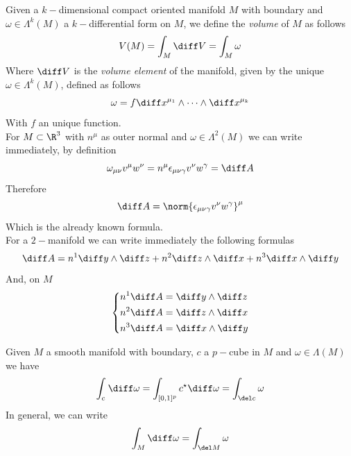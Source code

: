 \documentclass[../mmf.tex]{subfiles}
\begin{document}
\begin{dfn}
	Given a $k-$dimensional compact oriented manifold $M$ with boundary and $\omega\in\Lambda^k(M)$ a $k-$differential form on $M$, we define the \textit{volume} of $M$ as follows
	\begin{equation}
		V(M)=\int_M\diff V=\int_M\omega
		\label{eq:volumemanifold}
	\end{equation}
	Where $\diff V$ is the \textit{volume element} of the manifold, given by the unique $\omega\in\Lambda^k(M)$, defined as follows
	\begin{equation}
		\omega=f\diff x^{\mu_1}\wedge\cdots\wedge\diff x^{\mu_k}
		\label{eq:kdiffformm}
	\end{equation}
	With $f$ an unique function.\\
	For $M\subset\R^3$ with $n^\mu$ as outer normal and $\omega\in\Lambda^2(M)$ we can write immediately, by definition
	\begin{equation*}
		\omega_{\mu\nu}v^\mu w^\nu=n^\mu\epsilon_{\mu\nu\gamma}v^\nu w^\gamma=\diff A
	\end{equation*}
	Therefore
	\begin{equation}
		\diff A=\norm{\epsilon_{\mu\nu\gamma}v^\nu w^\gamma}^\mu
		\label{eq:diffar2}
	\end{equation}
	Which is the already known formula.\\
	For a $2-$manifold we can write immediately the following formulas
	\begin{equation}
		\diff A=n^1\diff y\wedge\diff z+n^2\diff z\wedge\diff x+n^3\diff x\wedge\diff y
		\label{eq:diffar3}
	\end{equation}
	And, on $M$
	\begin{equation}
		\left\{\begin{aligned}
				n^1\diff A&=\diff y\wedge\diff z\\
				n^2\diff A&=\diff z\wedge\diff x\\
				n^3\diff A&=\diff x\wedge\diff y
		\end{aligned}\right.
		\label{eq:formulasfordiffa}
	\end{equation}
\end{dfn}
\begin{thm}
	Given $M$ a smooth manifold with boundary, $c$ a $p-$cube in $M$ and $\omega\in\Lambda(M)$ we have
	\begin{equation}
		\int_{c}^{}\diff\omega=\int_{[0,1]^p}c^\star\diff\omega=\int_{\del c}\omega
		\label{eq:stokestheorem}
	\end{equation}
	In general, we can write
	\begin{equation}
		\int_M\diff\omega=\int_{\del M}\omega
		\label{eq:ggso}
	\end{equation}
\end{thm}
\end{document}
